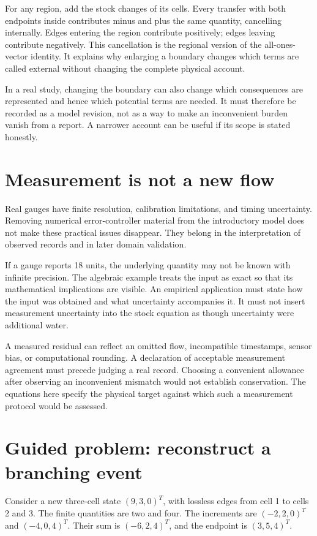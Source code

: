 For any region, add the stock changes of its cells. Every transfer with both endpoints inside contributes minus and plus the same quantity, cancelling internally. Edges entering the region contribute positively; edges leaving contribute negatively. This cancellation is the regional version of the all-ones-vector identity. It explains why enlarging a boundary changes which terms are called external without changing the complete physical account.

In a real study, changing the boundary can also change which consequences are represented and hence which potential terms are needed. It must therefore be recorded as a model revision, not as a way to make an inconvenient burden vanish from a report. A narrower account can be useful if its scope is stated honestly.

\section{Measurement is not a new flow}
Real gauges have finite resolution, calibration limitations, and timing uncertainty. Removing numerical error-controller material from the introductory model does not make these practical issues disappear. They belong in the interpretation of observed records and in later domain validation.

If a gauge reports 18 units, the underlying quantity may not be known with infinite precision. The algebraic example treats the input as exact so that its mathematical implications are visible. An empirical application must state how the input was obtained and what uncertainty accompanies it. It must not insert measurement uncertainty into the stock equation as though uncertainty were additional water.

A measured residual can reflect an omitted flow, incompatible timestamps, sensor bias, or computational rounding. A declaration of acceptable measurement agreement must precede judging a real record. Choosing a convenient allowance after observing an inconvenient mismatch would not establish conservation. The equations here specify the physical target against which such a measurement protocol would be assessed.

\section{Guided problem: reconstruct a branching event}
Consider a new three-cell state \((9,3,0)^T\), with lossless edges from cell 1 to cells 2 and 3. The finite quantities are two and four. The increments are \((-2,2,0)^T\) and \((-4,0,4)^T\). Their sum is \((-6,2,4)^T\), and the endpoint is \((3,5,4)^T\).

